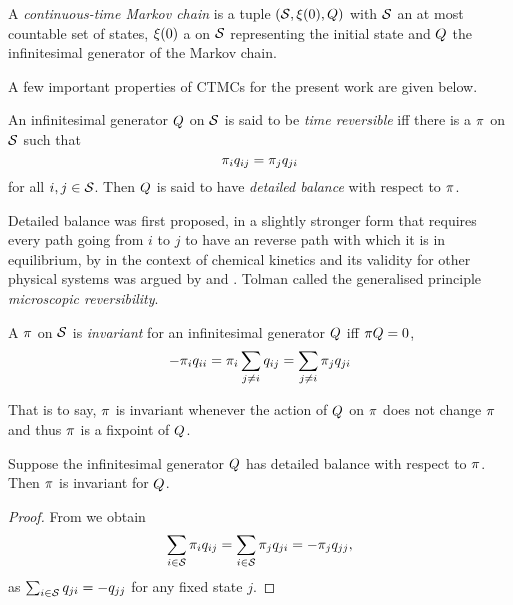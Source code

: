 \begin{definition}[CTMC]%
  A \emph{continuous-time Markov chain} is a tuple
  $\left(\mathcal{S}, \xi(0), Q\right)$ with
  $\mathcal{S}$ an at most countable set of states,
  $\xi(0)$ a \pmf on $\mathcal{S}$
  representing the initial state and
  $Q$ the infinitesimal generator of the Markov chain.
\end{definition}

A few important properties of CTMCs
for the present work are given below.

\begin{definition}
  An infinitesimal generator $Q$ on $\mathcal{S}$
  is said to be \emph{time reversible} iff
  there is a \pmf $\pi$ on $\mathcal{S}$ such that
  \begin{equation}
    \label{eq:detailed-balance}
    \pi_i q_{ij} = \pi_j q_{ji}
  \end{equation}
  for all $i,j \in \mathcal{S}$.
  Then $Q$ is said to have \emph{detailed balance}
  with respect to $\pi$.
\end{definition}

Detailed balance was first proposed,
in a slightly stronger form
that requires every path going from $i$ to $j$
to have an reverse path with which it is in equilibrium,
by \citet{wegscheider} in the context of chemical kinetics
and its validity for other physical systems was argued by
\citet{lewis} and \citet{tolman}.
Tolman called the generalised principle
\emph{microscopic reversibility}.

\begin{definition}
  A \pmf $\pi$ on $\mathcal{S}$ is
  \emph{invariant} for an infinitesimal generator $Q$
  iff $\pi Q = 0$, \ie
  \[ -\pi_i q_{ii} = \pi_i \sum_{j \neq i} q_{ij}
                  = \sum_{j \neq i} \pi_j q_{ji} \]
\end{definition}

That is to say, $\pi$ is invariant
whenever the action of $Q$ on $\pi$ does not change $\pi$
and thus $\pi$ is a fixpoint of $Q$.

\begin{lemma}
  Suppose the infinitesimal generator $Q$
  has detailed balance with respect to $\pi$.
  Then $\pi$ is invariant for $Q$.
\end{lemma}
\begin{proof}
  From  we obtain
  \[ \sum_{i \in \mathcal{S}} \pi_i q_{ij} =
     \sum_{i \in \mathcal{S}} \pi_j q_{ji} = -\pi_j q_{jj}, \]
  as $\sum_{i \in \mathcal{S}} q_{ji} = -q_{jj}$ for any fixed state $j$.
\end{proof}

